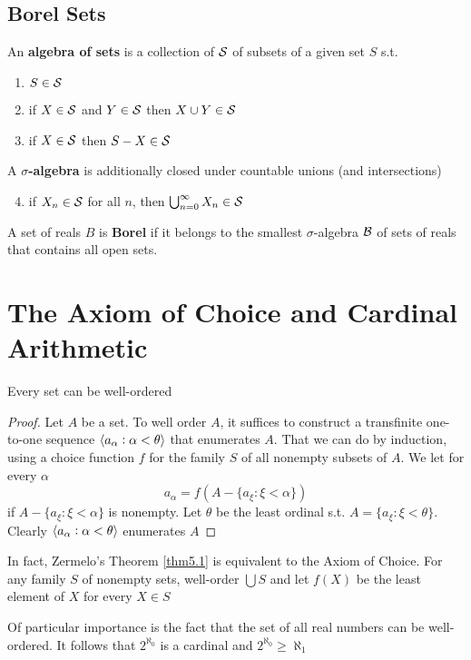 \documentclass[11pt]{article}
\begin{document}
\subsection{Borel Sets}
\label{sec:orga9dbe21}
\begin{definition}[]
An \textbf{algebra of sets} is a collection of \(\mathcal{S}\) of subsets of a given set \(S\)
s.t.
\begin{enumerate}
\item \(S\in\mathcal{S}\)
\item if \(X\in\mathcal{S}\) and \(Y\in\mathcal{S}\) then \(X\cup Y\in\mathcal{S}\)
\item if \(X\in\mathcal{S}\) then \(S-X\in\mathcal{S}\)
\end{enumerate}


A \textbf{\(\sigma\)-algebra} is additionally closed under countable unions (and
intersections)
\begin{enumerate}
\setcounter{enumi}{3}
\item if \(X_n\in\mathcal{S}\) for all \(n\), then \(\bigcup_{n=0}^\infty X_n\in\mathcal{S}\)
\end{enumerate}
\end{definition}

\begin{definition}[]
A set of reals \(B\) is \textbf{Borel} if it belongs to the smallest \(\sigma\)-algebra
\(\mathcal{B}\) of sets of reals that contains all open sets.
\end{definition}

\section{The Axiom of Choice and Cardinal Arithmetic}
\label{sec:orgcd7abf2}
\begin{theorem}
\label{thm5.1}
Every set can be well-ordered
\end{theorem}

\begin{proof}
Let \(A\) be a set. To well order \(A\), it suffices to construct a transfinite
one-to-one sequence \(\langle a_\alpha:\alpha<\theta\rangle\) that enumerates \(A\). That we can
do by induction, using a choice function \(f\) for the family \(S\) of all nonempty
subsets of \(A\). We let for every \(\alpha\) 
\begin{equation*}
a_\alpha=f(A-\{a_\xi:\xi<\alpha\})
\end{equation*}
if \(A-\{a_\xi:\xi<\alpha\}\) is nonempty. Let \(\theta\) be the least ordinal s.t.
\(A=\{a_\xi:\xi<\theta\}\). Clearly \(\langle a_\alpha:\alpha<\theta\rangle\) enumerates \(A\)
\end{proof}

In fact, Zermelo's Theorem \ref{thm5.1} is equivalent to the Axiom of Choice. For
any family \(S\) of nonempty sets, well-order \(\bigcup S\) and let \(f(X)\) be the
least element of \(X\) for every \(X\in S\)

Of particular importance is the fact that the set of all real numbers can be
well-ordered. It follows that \(2^{\aleph_0}\) is a cardinal and
\(2^{\aleph_0}\ge\aleph_1\) 
\end{document}
